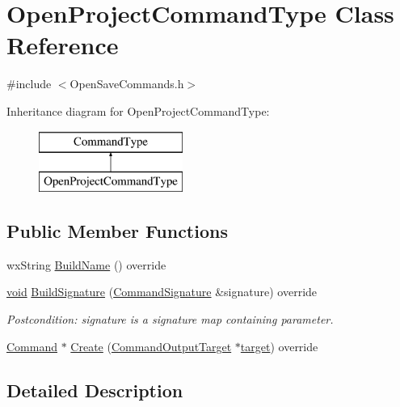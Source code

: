 \hypertarget{class_open_project_command_type}{}\section{Open\+Project\+Command\+Type Class Reference}
\label{class_open_project_command_type}


{\ttfamily \#include $<$Open\+Save\+Commands.\+h$>$}

Inheritance diagram for Open\+Project\+Command\+Type\+:\begin{figure}[H]
\begin{center}
\leavevmode
\includegraphics[height=2.000000cm]{class_open_project_command_type}
\end{center}
\end{figure}
\subsection*{Public Member Functions}
\begin{DoxyCompactItemize}
\item 
wx\+String \hyperlink{class_open_project_command_type_a28ccc273e19cf44a3315a22bb61c380f}{Build\+Name} () override
\item 
\hyperlink{sound_8c_ae35f5844602719cf66324f4de2a658b3}{void} \hyperlink{class_open_project_command_type_a448402c138866fed639e46ac97115060}{Build\+Signature} (\hyperlink{class_command_signature}{Command\+Signature} \&signature) override
\begin{DoxyCompactList}\small\item\em Postcondition\+: signature is a \textquotesingle{}signature\textquotesingle{} map containing parameter. \end{DoxyCompactList}\item 
\hyperlink{class_command}{Command} $\ast$ \hyperlink{class_open_project_command_type_a02acdfe692cd8279ae5e03c699643d05}{Create} (\hyperlink{class_command_output_target}{Command\+Output\+Target} $\ast$\hyperlink{lib_2expat_8h_a15a257516a87decb971420e718853137}{target}) override
\end{DoxyCompactItemize}


\subsection{Detailed Description}


